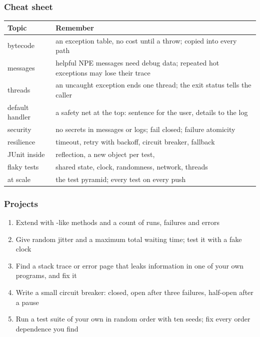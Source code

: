 \documentclass[aspectratio=169,10pt,compress]{beamer}
\begin{document}




\begin{frame}[t,fragile] \frametitle{Cheat sheet}


\begin{table}
		\scriptsize
		\begin{tabular}{@{}L{0.30\textwidth}L{0.62\textwidth}@{}}
			\toprule
			\textbf{Topic} & \textbf{Remember} \\
			\midrule
			bytecode & an exception table, no cost until a throw;  copied into every path \\
			messages & helpful NPE messages need debug data; repeated hot exceptions may lose their trace \\
			threads & an uncaught exception ends one thread; the exit status tells the caller \\
			default handler & a safety net at the top: sentence for the user, details to the log \\
			security & no secrets in messages or logs; fail closed; failure atomicity \\
			resilience & timeout, retry with backoff, circuit breaker, fallback \\
			JUnit inside & reflection, a new object per test,  \\
			flaky tests & shared state, clock, randomness, network, threads \\
			at scale & the test pyramid; every test on every push \\
			\bottomrule
		\end{tabular}
\end{table}%
\end{frame}




\begin{frame}[t,fragile] \frametitle{Projects}
	\begin{enumerate}\small
		\item Extend  with -like methods and a count of runs, failures and errors
		\item Give  random jitter and a maximum total waiting time; test it with a fake clock
		\item Find a stack trace or error page that leaks information in one of your own programs, and fix it
		\item Write a small circuit breaker: closed, open after three failures, half-open after a pause
		\item Run a test suite of your own in random order with ten seeds; fix every order dependence you find
	\end{enumerate}
\end{frame}
\end{document}
